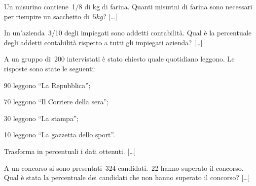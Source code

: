 \begin{multicols}{2}
\begin{esercizio}
\label{ese:3.183}
 Un misurino contiene~1/8 di kg di farina. Quanti misurini di farina
sono necessari per riempire un sacchetto di~$5\unit{kg}$? \hfill [\dots]
\end{esercizio}

% 
% 

\begin{esercizio}
\label{ese:3.187}
 In un'azienda~3/10 degli impiegati sono addetti
contabilità. Qual è la percentuale degli addetti contabilità
rispetto a tutti gli impiegati azienda? \hfill [\dots]
\end{esercizio}

\begin{esercizio}
\label{ese:3.188}
 A un gruppo di~200 intervistati è stato chiesto quale quotidiano
leggono. Le risposte sono state le seguenti:
\begin{itemize*}
\item 90 leggono ``La Repubblica'';
\item 70 leggono ``Il Corriere della sera'';
\item 30 leggono ``La stampa'';
\item 10 leggono ``La gazzetta dello sport''.
\end{itemize*}
Trasforma in percentuali i dati ottenuti. \hfill [\dots]
\end{esercizio}

\begin{esercizio}
\label{ese:3.189}
 A un concorso si sono presentati~324 candidati.~22 hanno superato il
concorso. Qual è stata la percentuale dei candidati che non hanno
superato il concorso? \hfill [\dots]
\end{esercizio}


\end{multicols}
